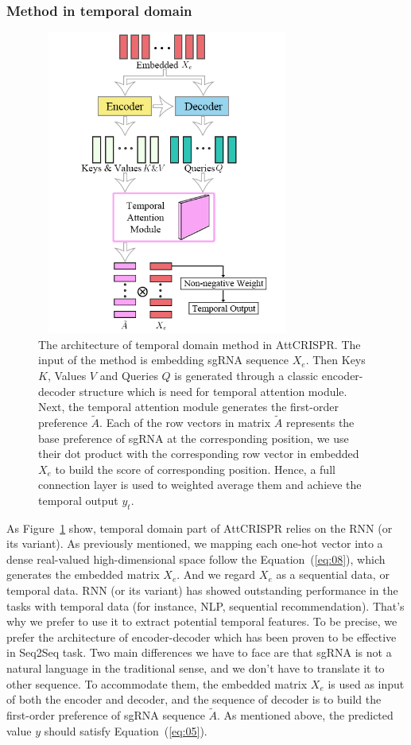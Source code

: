 \documentclass{bioinfo}
\begin{document}
\subsubsection{Method in temporal domain}
\begin{figure}[tpb]%
    \centerline{\includegraphics[width=86mm,height=100mm]{temporalmodule.png}}
    \caption{The architecture of temporal domain method in AttCRISPR. 
    The input of the method is embedding sgRNA sequence $X_e$. 
    Then Keys $K$, Values $V$ and Queries $Q$ is generated through a classic encoder-decoder structure which is need for temporal attention module.
    Next, the temporal attention module generates the first-order preference $\tilde{A}$. 
    Each of the row vectors in matrix $\tilde{A}$ represents the base preference of sgRNA at the corresponding position, we use their dot product with the corresponding row vector in embedded $X_e$ to build the score of corresponding position. 
    Hence, a full connection layer is used to weighted average them and achieve the temporal output $y_t$.
    }\label{fig:04}
\end{figure}

As Figure~\ref{fig:04} show, temporal domain part of AttCRISPR relies on the RNN (or its variant). 
As previously mentioned, we mapping each one-hot vector into a dense real-valued high-dimensional space follow the Equation~(\ref{eq:08}), which generates the embedded matrix $X_e$.
And we regard $X_{e}$ as a sequential data, or temporal data.
RNN (or its variant) has showed outstanding performance in the tasks with temporal data (for instance, NLP, sequential recommendation). 
That's why we prefer to use it to extract potential temporal features. 
To be precise, we prefer the architecture of encoder-decoder which has been proven to be effective in Seq2Seq task. 
Two main differences we have to face are that sgRNA is not a natural language in the traditional sense, and we don't have to translate it to other sequence. 
To accommodate them, the embedded matrix $X_e$ is used as input of both the encoder and decoder, and the sequence of decoder is to build the first-order preference of sgRNA sequence $\tilde{A}$. 
As mentioned above, the predicted value $y$ should satisfy Equation~(\ref{eq:05}). 
\end{document}
